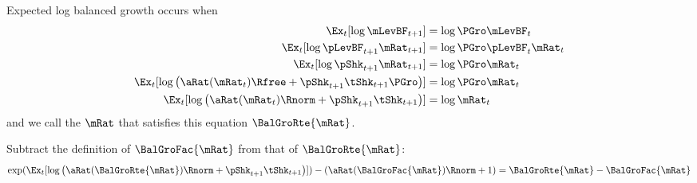 \documentclass[\econtexRoot/BufferStockTheory]{subfiles}
\begin{document}
Expected log balanced growth occurs when
\begin{equation}\begin{split}
    \Ex_{t}[\log \mLevBF_{t+1}] & = \log \PGro \mLevBF_{t}
\\      \Ex_{t}[\log \pLevBF_{t+1}\mRat_{t+1}] & = \log \PGro \pLevBF_{t} \mRat_{t}
\\      \Ex_{t}[\log \pShk_{t+1}\mRat_{t+1}] & = \log \PGro \mRat_{t}
\\      \Ex_{t}[\log \left(\aRat(\mRat_{t})\Rfree+\pShk_{t+1}\tShk_{t+1}\PGro\right)] & = \log \PGro \mRat_{t}
\\      \Ex_{t}[\log \left(\aRat(\mRat_{t})\Rnorm+\pShk_{t+1}\tShk_{t+1}\right)] & = \log \mRat_{t}
\end{split}\end{equation}
and we call the $\mRat$ that satisfies this equation $\BalGroRte{\mRat}$.

Subtract the definition of $\BalGroFac{\mRat}$ from that of $\BalGroRte{\mRat}$:
\begin{equation}\begin{split}
    \exp(\Ex_{t}[\log \left(\aRat(\BalGroRte{\mRat})\Rnorm+\pShk_{t+1}\tShk_{t+1}\right)]) - (\aRat(\BalGroFac{\mRat})\Rnorm+1 ) = \BalGroRte{\mRat} - \BalGroFac{\mRat}
\end{split}\end{equation}
\end{document}
